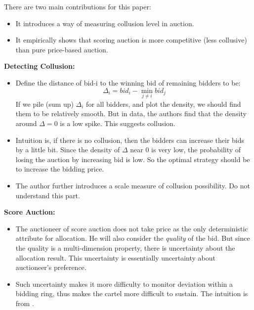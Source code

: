 \documentclass{book}
\theoremstyle{plain}
\theoremstyle{definition}
\newcommand{\red}[1]{{\color{red} #1}}
\begin{document}
There are two main contributions for this paper:
\begin{itemize}
	\item It introduces a way of measuring collusion level in auction.
	\item It empirically shows that scoring auction is more competitive (less collusive) than pure price-based auction.
\end{itemize}

\vspace{1em}
\noindent
\textbf{Detecting Collusion:}
\begin{itemize}
	\item Define the distance of bid-i to the winning bid of remaining bidders to be:
	$$\Delta_i = bid_i - \min_{j\neq i}bid_j$$
	If we pile (sum up) $\Delta_i$ for all bidders, and plot the density, we should find them to be relatively smooth.
	But in data, the authors find that the density around $\Delta = 0$ is a low spike. This suggests collusion.
	\item Intuition is, if there is no collusion, then the bidders can increase their bids by a little bit. Since the density of $\Delta$ near 0 is very low, the probability of losing the auction by increasing bid is low. So the optimal strategy should be to increase the bidding price.
	\item The author further introduces a scale measure of collusion possibility. \red{Do not understand this part.}
\end{itemize}

\vspace{1em}
\noindent
\textbf{Score Auction:}
\begin{itemize}
	\item The auctioneer of score auction does not take price as the only deterministic attribute for allocation. He will also consider the \textit{quality} of the bid. But since the quality is a multi-dimension property, there is uncertainty about the allocation result. This uncertainty is essentially uncertainty about auctioneer's preference.
	\item Such uncertainty makes it more difficulty to monitor deviation within a bidding ring, thus makes the cartel more difficult to sustain. The intuition is from \cite{Green_Porter:1984EMCA}.
\end{itemize}





\end{document}

